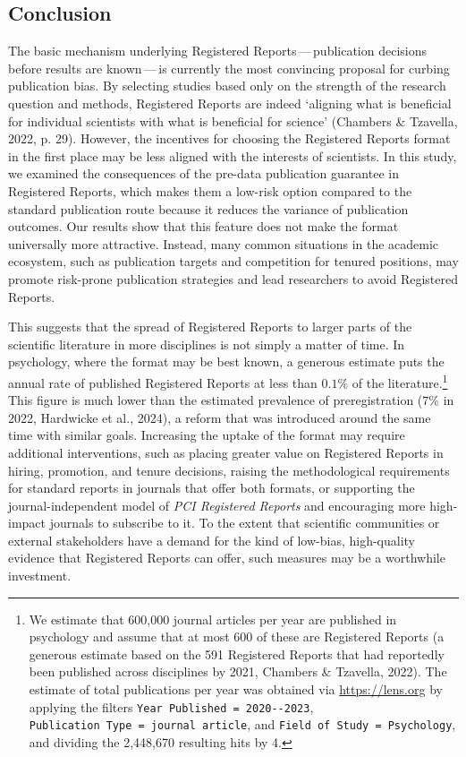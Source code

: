 \documentclass[
  ,man,mask,floatsintext]{apa6}
\begin{document}
\hypertarget{conclusion}{%
\subsection{Conclusion}\label{conclusion}}

The basic mechanism underlying Registered Reports\(\,\)---\(\,\)publication decisions before results are known\(\,\)---\(\,\)is currently the most convincing proposal for curbing publication bias.
By selecting studies based only on the strength of the research question and methods, Registered Reports are indeed `aligning what is beneficial for individual scientists with what is beneficial for science' (Chambers \& Tzavella, 2022, p. 29).
However, the incentives for choosing the Registered Reports format in the first place may be less aligned with the interests of scientists.
In this study, we examined the consequences of
the pre-data publication guarantee in Registered Reports, which makes them a low-risk option compared to the standard publication route because it reduces the variance of publication outcomes.
Our results show that this feature does not make the format universally more attractive.
Instead, many common situations in the academic ecosystem, such as publication targets and competition for tenured positions, may promote risk-prone publication strategies and lead researchers to avoid Registered Reports.

This suggests that the spread of Registered Reports to larger parts of the scientific literature in more disciplines is not simply a matter of time.
In psychology, where the format may be best known, a generous estimate puts the annual rate of published Registered Reports at less than \(0.1\%\) of the literature.\footnote{We estimate that 600,000 journal articles per year are published in psychology and assume that at most 600 of these are Registered Reports (a generous estimate based on the 591 Registered Reports that had reportedly been published across disciplines by 2021, Chambers \& Tzavella, 2022). The estimate of total publications per year was obtained via \url{https://lens.org} by applying the filters \texttt{Year\ Published\ =\ 2020-\/-2023}, \texttt{Publication\ Type\ =\ journal\ article}, and \texttt{Field\ of\ Study\ =\ Psychology}, and dividing the 2,448,670 resulting hits by 4.}
This figure is much lower than the estimated prevalence of preregistration (\(7\%\) in 2022, Hardwicke et al., 2024), a reform that was introduced around the same time with similar goals.
Increasing the uptake of the format may require additional interventions, such as placing greater value on Registered Reports in hiring, promotion, and tenure decisions, raising the methodological requirements for standard reports in journals that offer both formats, or supporting the journal-independent model of \emph{PCI Registered Reports} and encouraging more high-impact journals to subscribe to it.
To the extent that scientific communities or external stakeholders have a demand for the kind of low-bias, high-quality evidence that Registered Reports can offer, such measures may be a worthwhile investment.
\end{document}
